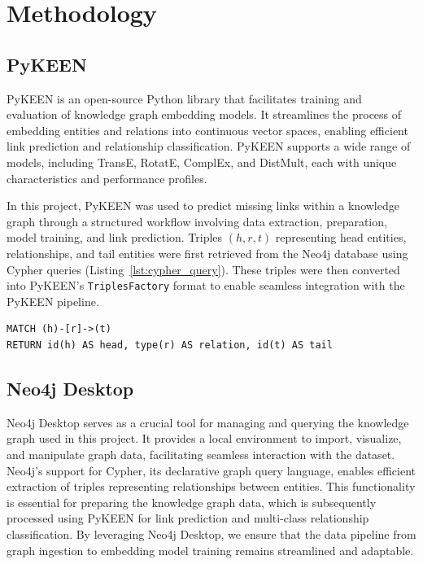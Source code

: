 \section*{Methodology}

\subsection*{PyKEEN}

PyKEEN \cite{pykeen} is an open-source Python library that facilitates training and evaluation of knowledge graph embedding models.
It streamlines the process of embedding entities and relations into continuous vector spaces, enabling efficient link prediction and relationship classification.
PyKEEN supports a wide range of models, including TransE, RotatE, ComplEx, and DistMult, each with unique characteristics and performance profiles.

In this project, PyKEEN was used to predict missing links within a knowledge graph through a structured workflow involving data extraction, preparation, model training, and link prediction. Triples $(h, r, t)$ representing head entities, relationships, and tail entities were first retrieved from the Neo4j database using Cypher queries (Listing~\ref{lst:cypher_query}). These triples were then converted into PyKEEN's \texttt{TriplesFactory} format to enable seamless integration with the PyKEEN pipeline.

\begin{lstlisting}[caption=Cypher query to retrieve triples., label=lst:cypher_query]
MATCH (h)-[r]->(t)
RETURN id(h) AS head, type(r) AS relation, id(t) AS tail
\end{lstlisting}

\subsection*{Neo4j Desktop}

Neo4j Desktop \cite{neo4j} serves as a crucial tool for managing and querying the knowledge graph used in this project. It provides a local environment to import, visualize, and manipulate graph data, facilitating seamless interaction with the dataset. Neo4j's support for Cypher, its declarative graph query language, enables efficient extraction of triples representing relationships between entities. This functionality is essential for preparing the knowledge graph data, which is subsequently processed using PyKEEN for link prediction and multi-class relationship classification. By leveraging Neo4j Desktop, we ensure that the data pipeline from graph ingestion to embedding model training remains streamlined and adaptable.

